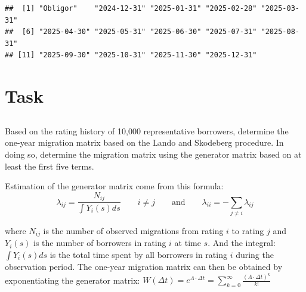 \documentclass[
  11pt,
]{article}
\begin{document}
\begin{verbatim}
##  [1] "Obligor"    "2024-12-31" "2025-01-31" "2025-02-28" "2025-03-31"
##  [6] "2025-04-30" "2025-05-31" "2025-06-30" "2025-07-31" "2025-08-31"
## [11] "2025-09-30" "2025-10-31" "2025-11-30" "2025-12-31"
\end{verbatim}

\section{\texorpdfstring{\textbf{Task}}{Task}}\label{task}

\subsection{}\label{section}

Based on the rating history of 10,000 representative borrowers,
determine the one-year migration matrix based on the Lando and Skodeberg
procedure. In doing so, determine the migration matrix using the
generator matrix based on at least the first five terms.

Estimation of the generator matrix come from this formula:
\[\lambda_{ij} = \frac{N_{ij}}{\int Y_{i}(s)ds} \qquad i \neq j \qquad \text{and} \qquad \lambda_{ii} = -\sum_{j \neq i} \lambda_{ij}\]

where \(N_{ij}\) is the number of observed migrations from rating \(i\)
to rating \(j\) and \(Y_{i}(s)\) is the number of borrowers in rating
\(i\) at time \(s\). And the integral: \(\int Y_{i}(s)ds\) is the total
time spent by all borrowers in rating \(i\) during the observation
period. The one-year migration matrix can then be obtained by
exponentiating the generator matrix:
\(W(\Delta t) = e^{\Lambda \cdot \Delta t} = \sum_{k=0}^{\infty} \frac{(\Lambda \cdot \Delta t)^k}{k!}\)
\end{document}
